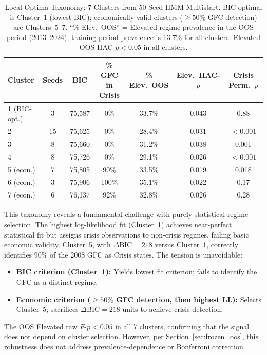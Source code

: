 \documentclass[sigconf,anonymous]{acmart}
\begin{document}
\begin{table}[t]
\centering
\caption{Local Optima Taxonomy: 7 Clusters from 50-Seed HMM Multistart.
BIC-optimal is Cluster~1 (lowest BIC); economically valid clusters ($\geq 50\%$ GFC detection)
are Clusters~5--7. ``\% Elev.\ OOS'' = Elevated regime prevalence in the OOS period (2013--2024);
training-period prevalence is 13.7\% for all clusters. Elevated OOS HAC-$p < 0.05$ in all clusters.}
\label{tab:local_optima}
\scriptsize
\begin{tabular}{@{}lcccccc@{}}
\toprule
Cluster & Seeds & BIC & \% GFC in Crisis & \% Elev.\ OOS & Elev.\ HAC-$p$ & Crisis Perm.\ $p$ \\
\midrule
1 (BIC-opt.) & 3 & 75{,}587 & 0\% & 33.7\% & 0.043 & 0.88 \\
2 & 15 & 75{,}625 & 0\% & 28.4\% & 0.031 & $< 0.001$ \\
3 & 8 & 75{,}660 & 0\% & 31.2\% & 0.038 & 0.001 \\
4 & 8 & 75{,}726 & 0\% & 29.1\% & 0.026 & $< 0.001$ \\
5 (econ.) & 7 & 75{,}805 & 90\% & 33.5\% & 0.019 & 0.018 \\
6 (econ.) & 3 & 75{,}906 & 100\% & 35.1\% & 0.022 & 0.17 \\
7 (econ.) & 6 & 76{,}137 & 92\% & 32.8\% & 0.026 & 0.28 \\
\bottomrule
\end{tabular}
\end{table}

This taxonomy reveals a fundamental challenge with purely statistical regime selection.
The highest log-likelihood fit (Cluster~1) achieves near-perfect statistical fit but
assigns crisis observations to non-crisis regimes, failing basic economic validity.
Cluster~5, with $\Delta\text{BIC} = 218$ versus Cluster~1, correctly identifies 90\% of
the 2008 GFC as Crisis states. The tension is unavoidable:
\begin{itemize}
\item \textbf{BIC criterion (Cluster~1):} Yields lowest fit criterion; fails to identify
the GFC as a distinct regime.
\item \textbf{Economic criterion ($\geq 50\%$ GFC detection, then highest LL):} Selects
Cluster~5; sacrifices $\Delta\text{BIC} = 218$ units to achieve crisis detection.
\end{itemize}

The OOS Elevated raw $F$-$p < 0.05$ in all 7 clusters, confirming that the
signal does not depend on cluster selection. However, per Section~\ref{sec:frozen_oos},
this robustness does not address prevalence-dependence or Bonferroni correction.
\end{document}
